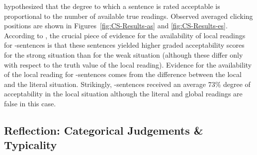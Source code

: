 \documentclass[fleqn,reqno,10pt,draft]{article}
\newcommand{\as}{\acro{as}}
\renewcommand{\es}{\acro{es}}
\begin{document}

\citeauthor{ChemlaSpector2010:Experimental-Ev} hypothesized that the
degree to which a sentence is rated acceptable is proportional to the
number of available true readings. Observed averaged clicking
positions are shown in Figures~\ref{fig:CS-Results-as} and
\ref{fig:CS-Results-es}.
%
%
According to \citeauthor{ChemlaSpector2010:Experimental-Ev}, the
crucial piece of evidence for the availability of local readings for
\as-sentences is that these sentences yielded higher graded
acceptability scores for the strong situation than for the weak
situation (although these differ only with respect to the truth value
of the local reading). Evidence for the availability
of the local reading for \es-sentences comes from the difference
between the local and the literal situation. Strikingly, \es-sentences
received an average 73\% degree of acceptability in the local
situation although the literal and global readings are false in this
case.

\subsection{Reflection: Categorical Judgements \& Typicality}
\label{sec:local-read-categ}
\end{document}

